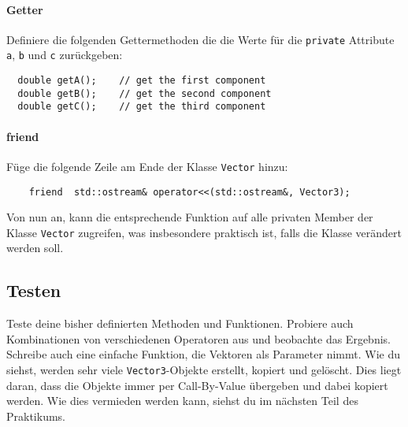 \paragraph{Getter}
Definiere die folgenden Gettermethoden die die Werte für die \texttt{private} Attribute \texttt{a}, \texttt{b} und \texttt{c} zurückgeben:
\begin{lstlisting}
  double getA();	// get the first component
  double getB();	// get the second component
  double getC();	// get the third component
\end{lstlisting}

\paragraph{friend}
Füge die folgende Zeile am Ende der Klasse \texttt{Vector} hinzu:
\begin{lstlisting}
    friend  std::ostream& operator<<(std::ostream&, Vector3);
\end{lstlisting}
Von nun an, kann die entsprechende Funktion auf alle privaten Member der Klasse \texttt{Vector} zugreifen, was insbesondere praktisch ist, falls die Klasse verändert werden soll.



\subsection{Testen}
Teste deine bisher definierten Methoden und Funktionen.
Probiere auch Kombinationen von verschiedenen Operatoren aus und beobachte das Ergebnis.
Schreibe auch eine einfache Funktion, die Vektoren als Parameter nimmt.
Wie du siehst, werden sehr viele \texttt{Vector3}-Objekte erstellt, kopiert und gelöscht.
Dies liegt daran, dass die Objekte immer per Call-By-Value übergeben und dabei kopiert werden.
Wie dies vermieden werden kann, siehst du im nächsten Teil des Praktikums.
